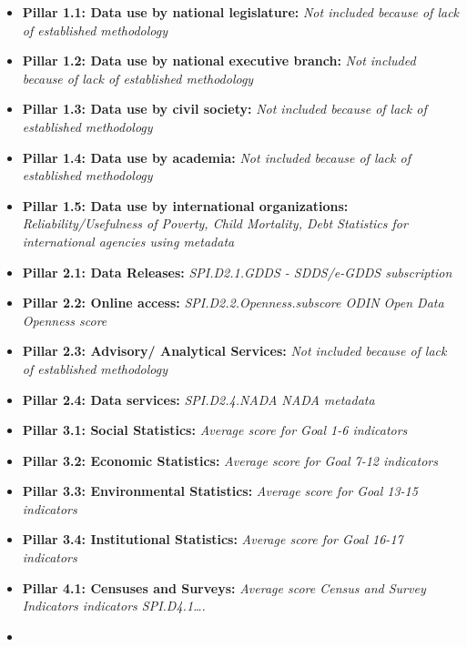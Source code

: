 \documentclass[
]{article}
\begin{document}
\begin{itemize}
\item
  \textbf{Pillar 1.1: Data use by national legislature:} \emph{Not included because of lack of established methodology}\\
\item
  \textbf{Pillar 1.2: Data use by national executive branch:} \emph{Not included because of lack of established methodology}\\
\item
  \textbf{Pillar 1.3: Data use by civil society:} \emph{Not included because of lack of established methodology}\\
\item
  \textbf{Pillar 1.4: Data use by academia:} \emph{Not included because of lack of established methodology}\\
\item
  \textbf{Pillar 1.5: Data use by international organizations:} \emph{Reliability/Usefulness of Poverty, Child Mortality, Debt Statistics for international agencies using metadata}
\item
  \textbf{Pillar 2.1: Data Releases:} \emph{SPI.D2.1.GDDS - SDDS/e-GDDS subscription}\\
\item
  \textbf{Pillar 2.2: Online access:} \emph{SPI.D2.2.Openness.subscore ODIN Open Data Openness score}\\
\item
  \textbf{Pillar 2.3: Advisory/ Analytical Services:} \emph{Not included because of lack of established methodology}\\
\item
  \textbf{Pillar 2.4: Data services:} \emph{SPI.D2.4.NADA NADA metadata}
\item
  \textbf{Pillar 3.1: Social Statistics:} \emph{Average score for Goal 1-6 indicators}
\item
  \textbf{Pillar 3.2: Economic Statistics:} \emph{Average score for Goal 7-12 indicators}\\
\item
  \textbf{Pillar 3.3: Environmental Statistics:} \emph{Average score for Goal 13-15 indicators}\\
\item
  \textbf{Pillar 3.4: Institutional Statistics:} \emph{Average score for Goal 16-17 indicators}
\item
  \textbf{Pillar 4.1: Censuses and Surveys:} \emph{Average score Census and Survey Indicators indicators SPI.D4.1\ldots.}
\item

\end{itemize}
\end{document}
